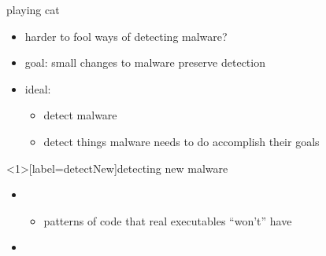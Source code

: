 
\begin{frame}{playing cat}
    \begin{itemize}
    \item harder to fool ways of detecting malware?
    \item goal: small changes to malware preserve detection
    \item ideal: 
        \begin{itemize}
        \item detect  malware
        \item detect things malware needs to do accomplish their goals
        \end{itemize}
    \end{itemize}
\end{frame}

\begin{frame}<1>[label=detectNew]{detecting new malware}
    \begin{itemize}
    \item {}
        \begin{itemize}
        \item patterns of code that real executables ``won't'' have
        \end{itemize}
    \item {}
    \end{itemize}
\end{frame}



